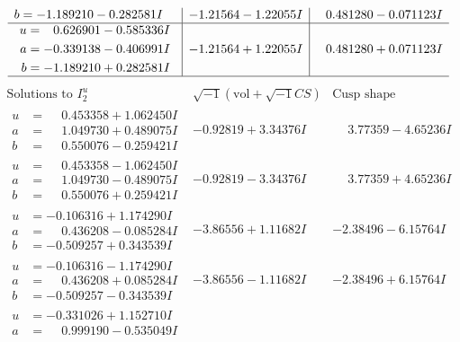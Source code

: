 \documentclass[1p]{elsarticle_modified}
\theoremstyle{definition}
\newcommand{\I}{\sqrt{-1}}
\begin{document}
$$\begin{array}{c|c|c}
\begin{aligned}
b &= -1.189210 - 0.282581 I\end{aligned}
 & -1.21564 - 1.22055 I & \phantom{-}0.481280 - 0.071123 I \\ \hline\begin{aligned}
u &= \phantom{-}0.626901 - 0.585336 I \\
a &= -0.339138 - 0.406991 I \\
b &= -1.189210 + 0.282581 I\end{aligned}
 & -1.21564 + 1.22055 I & \phantom{-}0.481280 + 0.071123 I\\
 \hline 
 \end{array}$$\newpage$$\begin{array}{c|c|c}  
\text{Solutions to }I^u_{2}& \I (\text{vol} + \sqrt{-1}CS) & \text{Cusp shape}\\
 \hline 
\begin{aligned}
u &= \phantom{-}0.453358 + 1.062450 I \\
a &= \phantom{-}1.049730 + 0.489075 I \\
b &= \phantom{-}0.550076 - 0.259421 I\end{aligned}
 & -0.92819 + 3.34376 I & \phantom{-}3.77359 - 4.65236 I \\ \hline\begin{aligned}
u &= \phantom{-}0.453358 - 1.062450 I \\
a &= \phantom{-}1.049730 - 0.489075 I \\
b &= \phantom{-}0.550076 + 0.259421 I\end{aligned}
 & -0.92819 - 3.34376 I & \phantom{-}3.77359 + 4.65236 I \\ \hline\begin{aligned}
u &= -0.106316 + 1.174290 I \\
a &= \phantom{-}0.436208 - 0.085284 I \\
b &= -0.509257 + 0.343539 I\end{aligned}
 & -3.86556 + 1.11682 I & -2.38496 - 6.15764 I \\ \hline\begin{aligned}
u &= -0.106316 - 1.174290 I \\
a &= \phantom{-}0.436208 + 0.085284 I \\
b &= -0.509257 - 0.343539 I\end{aligned}
 & -3.86556 - 1.11682 I & -2.38496 + 6.15764 I \\ \hline\begin{aligned}
u &= -0.331026 + 1.152710 I \\
a &= \phantom{-}0.999190 - 0.535049 I \\

\end{aligned}
\end{array}$$
\end{document}
